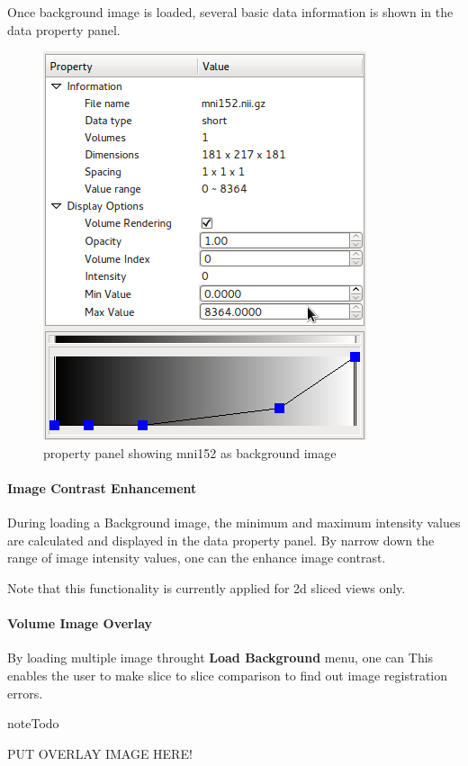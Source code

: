 \documentclass[letterpaper,10pt,english]{sphinxmanual}
\begin{document}
Once background image is loaded, several basic data information is shown in the
data property panel.
\begin{figure}[htbp]
\centering
\capstart

\includegraphics{view_bgprop.png}
\caption{property panel showing mni152 as background image}\end{figure}


\paragraph{Image Contrast Enhancement}
\label{visualization:image-contrast-enhancement}
During loading a Background image, the minimum and maximum intensity values are
calculated and displayed in the data property panel.
By narrow down the range of image intensity values, one can the enhance image contrast.

Note that this functionality is currently applied for 2d sliced views only.


\paragraph{Volume Image Overlay}
\label{visualization:volume-image-overlay}
By loading multiple image throught \textbf{Load Background} menu, one can
This enables the user to make slice to slice comparison to find out image registration errors.

\begin{notice}{note}{Todo}

PUT OVERLAY IMAGE HERE!
\end{notice}
\end{document}
